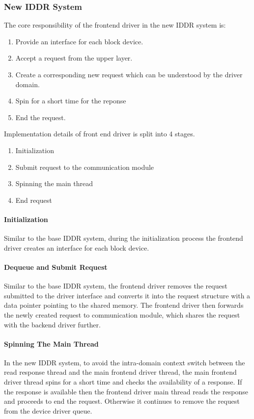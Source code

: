 \subsubsection*{New IDDR System}
The core responsibility of the frontend driver in the new IDDR system is:
\begin{enumerate}
\item Provide an interface for each block device.
\item Accept a request from the upper layer.
\item Create a corresponding new request which can be understood by the driver domain.
\item Spin for a short time for the reponse
\item End the request.
\end{enumerate}

Implementation details of front end driver is split into 4 stages. 
\begin{enumerate}
\item Initialization
\item Submit request to the communication module
\item Spinning the main thread
\item End request
\end{enumerate}

\paragraph{Initialization}
Similar to the base IDDR system, during the initialization process the frontend driver creates an interface for each block device.

\paragraph{Dequeue and Submit Request}
Similar to the base IDDR system, the frontend driver removes the request submitted to the driver interface and converts it into the request structure with a data pointer pointing to the shared memory. The frontend driver then forwards the newly created request to communication module, which shares the request with the backend driver further.

\paragraph{Spinning The Main Thread}
In the new IDDR system, to avoid the intra-domain context switch between the read response thread and the main frontend driver thread, the main frontend driver thread spins for a short time and checks the availability of a response. If the response is available then the frontend driver main thread reads the response and proceeds to end the request. Otherwise it continues to remove the request from the device driver queue.

